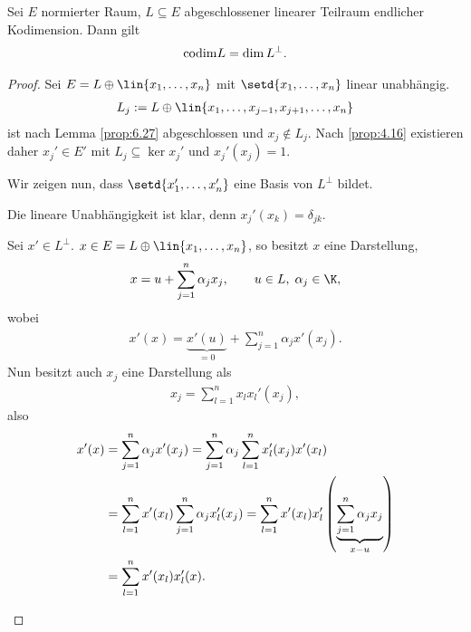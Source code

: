 \begin{lem}
\label{prop:6.28}
Sei $E$ normierter Raum, $L\subseteq E$ abgeschlossener linearer Teilraum
endlicher Kodimension. Dann gilt
\begin{align*}
\mathrm{codim} L = \dim L^\bot.
\end{align*}
\end{lem}
\begin{proof}
Sei $E=L\oplus\lin{x_1,\ldots,x_n}$ mit $\setd{x_1,\ldots,x_n}$ linear
unabhängig.
\begin{align*}
L_j := L\oplus \lin{x_1,\ldots,x_{j-1},x_{j+1},\ldots,x_n}
\end{align*}
ist nach Lemma \ref{prop:6.27} abgeschlossen und $x_j\notin L_j$. Nach
\ref{prop:4.16} existieren daher $x_j'\in E'$ mit $L_j\subseteq \ker x_j'$ und
$x_j'(x_j)=1$.

Wir zeigen nun, dass $\setd{x_1',\ldots,x_n'}$ eine Basis von $L^\bot$ bildet.
\begin{proofenum}
\item Die lineare Unabhängigkeit ist klar, denn $x_j'(x_k)=\delta_{jk}$.
\item Sei $x'\in L^\bot$. $x\in E=L\oplus\lin{x_1,\ldots,x_n}$, so besitzt $x$
eine Darstellung,
\begin{align*}
x = u + \sum_{j=1}^n \alpha_j x_j,\qquad u\in L,\; \alpha_j\in\K,
\end{align*}
wobei
\begin{align*}
x'(x) = \underbrace{x'(u)}_{=0} + \sum_{j=1}^n \alpha_j x'(x_j).
\end{align*}
Nun besitzt auch $x_j$ eine Darstellung als
\begin{align*}
x_j = \sum_{l=1}^n x_l x_l'(x_j),
\end{align*}
also
\begin{align*}
x'(x) &= \sum_{j=1}^n \alpha_j x'(x_j)
= \sum_{j=1}^n \alpha_j \sum_{l=1}^n x_l'(x_j) x'(x_l)\\
&= \sum_{l=1}^n x'(x_l) \sum_{j=1}^n \alpha_j  x_l'(x_j)
= \sum_{l=1}^n x'(x_l)  x_l'\left(\underbrace{\sum_{j=1}^n  \alpha_j
x_j}_{x-u}\right)\\
&=
\sum_{l=1}^n x'(x_l)  x_l'(x).\qedhere 
\end{align*}
\end{proofenum}
\end{proof}


